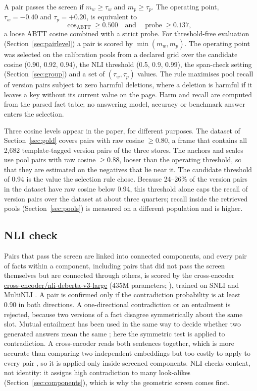 \documentclass{CUP-JNL-NLP}
\begin{document}
A pair passes the screen if $m_w\ge\tau_w$ and $m_p\ge\tau_p$. The operating point, $\tau_w=-0.40$ and $\tau_p=+0.20$, is equivalent to
\begin{equation}
\cos_{\mathrm{ABTT}}\ge0.500\quad\text{and}\quad\operatorname{probe}\ge0.137,
\end{equation}
a loose ABTT cosine combined with a strict probe. For threshold-free evaluation (Section~\ref{sec:pairlevel}) a pair is scored by $\min(m_w,m_p)$. The operating point was selected on the calibration pools from a declared grid over the candidate cosine (0.90, 0.92, 0.94), the NLI threshold (0.5, 0.9, 0.99), the span-check setting (Section~\ref{sec:group}) and a set of $(\tau_w,\tau_p)$ values. The rule maximises pool recall of version pairs subject to zero harmful deletions, where a deletion is harmful if it leaves a key without its current value on the page. Harm and recall are computed from the parsed fact table; no answering model, accuracy or benchmark answer enters the selection.

Three cosine levels appear in the paper, for different purposes. The dataset of Section~\ref{sec:gold} covers pairs with raw cosine $\ge0.80$, a frame that contains all 2,682 template-tagged version pairs of the three stores. The anchors and scales use pool pairs with raw cosine $\ge0.88$, looser than the operating threshold, so that they are estimated on the negatives that lie near it. The candidate threshold of 0.94 is the value the selection rule chose. Because 24--26\% of the version pairs in the dataset have raw cosine below 0.94, this threshold alone caps the recall of version pairs over the dataset at about three quarters; recall inside the retrieved pools (Section~\ref{sec:pools}) is measured on a different population and is higher.

\subsection{NLI check}
\label{sec:nli}

Pairs that pass the screen are linked into connected components, and every pair of facts within a component, including pairs that did not pass the screen themselves but are connected through others, is scored by the cross-encoder \url{cross-encoder/nli-deberta-v3-large} (435M parameters; \citealp{he2023debertav3}), trained on SNLI and MultiNLI \citep{bowman2015large,williams2018broad}. A pair is confirmed only if the contradiction probability is at least 0.90 in both directions. A one-directional contradiction or an entailment is rejected, because two versions of a fact disagree symmetrically about the same slot. Mutual entailment has been used in the same way to decide whether two generated answers mean the same \citep{kuhn2023semantic,farquhar2024semantic}; here the symmetric test is applied to contradiction. A cross-encoder reads both sentences together, which is more accurate than comparing two independent embeddings but too costly to apply to every pair \citep{reimers2019sentencebert}, so it is applied only inside screened components. NLI checks content, not identity: it assigns high contradiction to many look-alikes (Section~\ref{sec:components}), which is why the geometric screen comes first.
\end{document}
